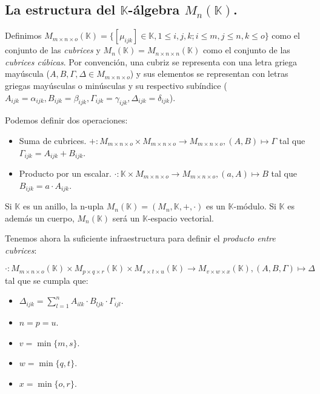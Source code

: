 \documentclass[a4paper, titlepage]{article}
\begin{document}
\subsection{La estructura del $\mathbb{K}$-álgebra $M_n (\mathbb{K})$.}

Definimos $M_{m\times n\times o} (\mathbb{K}) = \{ [\mu_{ijk}] \in \mathbb{K}, 1 \le i,j,k; i \le m, j \le n, k \le o\}$ como el conjunto de las \textit{cubrices} y $M_n (\mathbb{K}) = M_{n\times n\times n} (\mathbb{K})$ como el conjunto de las \textit{cubrices cúbicas}. Por convención, una cubriz se representa con una letra griega mayúscula ($A, B, \Gamma, \Delta \in M_{m\times n\times o}$) y sus elementos se representan con letras griegas mayúsculas o minúsculas y su respectivo subíndice ($A_{ijk} = \alpha_{ijk}, B_{ijk} = \beta_{ijk}, \Gamma_{ijk} = \gamma_{ijk}, \Delta_{ijk} = \delta_{ijk}$).


Podemos definir dos operaciones:

\begin{itemize}
	\item Suma de cubrices. $+: M_{m\times n\times o} \times M_{m\times n\times o} \rightarrow M_{m\times n\times o}, (A, B) \mapsto \Gamma$ tal que $\Gamma_{ijk} = A_{ijk} + B_{ijk}$.
	\item Producto por un escalar. $\cdot: \mathbb{K} \times M_{m\times n\times o} \rightarrow M_{m\times n\times o}, (a, A) \mapsto B$ tal que $B_{ijk} = a \cdot A_{ijk}$.
\end{itemize}

Si $\mathbb{K}$ es un anillo, la n-upla $M_n (\mathbb{K}) = (M_n, \mathbb{K}, +, \cdot)$ es un $\mathbb{K}$-módulo. Si $\mathbb{K}$ es además un cuerpo, $M_n (\mathbb{K})$ será un $\mathbb{K}$-espacio vectorial.

\newpage

Tenemos ahora la suficiente infraestructura para definir el \textit{producto entre cubrices}:

$$\cdot: M_{m\times n\times o} (\mathbb{K}) \times M_{p\times q\times r} (\mathbb{K}) \times M_{s\times t\times u} (\mathbb{K}) \rightarrow M_{v\times w\times x} (\mathbb{K}), (A, B, \Gamma) \mapsto \Delta$$ tal que se cumpla que:

\begin{itemize}
	\item $\Delta_{ijk} = \sum\limits_{l=1}^{n} A_{ilk} \cdot B_{ljk} \cdot \Gamma_{ijl}$.
	\item $n = p = u$.
	\item $v = \min\{m, s\}$.
	\item $w = \min\{q, t\}$.
	\item $x = \min\{o, r\}$.
\end{itemize}
\end{document}
